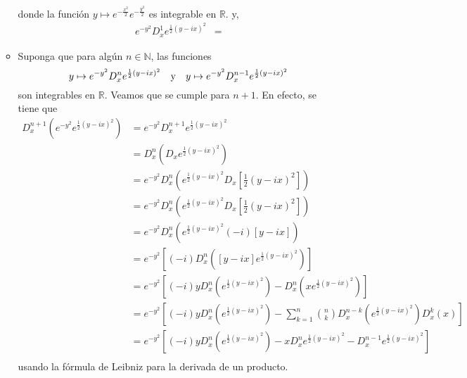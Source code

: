\documentclass[12pt]{report}
\newcounter{it}
\theoremstyle{largebreak}
\begin{document}
\begin{sol}
\begin{itemize}
\begin{itemize}
                donde la función $y\mapsto e^{-\frac{x^2}{2}}e^{-\frac{y^2}{2}}$ es integrable en $\mathbb{R}$.
                y,
                \begin{equation*}
                    \begin{split}
                        e^{ -y^2}D_x^1e^{\frac{1}{2}\left(y-ix \right)^2}&=
                    \end{split}
                \end{equation*}
                \item Suponga que para algún $n\in\mathbb{N}$, las funciones
                \begin{equation*}
                    y\mapsto e^{ -y^2}D_x^ne^{\frac{1}{2}\left(y-ix \right)^2}\quad\textup{y}\quad y\mapsto e^{ -y^2}D_x^{n-1}e^{\frac{1}{2}\left(y-ix \right)^2}
                \end{equation*}
                son integrables en $\mathbb{R}$. Veamos que se cumple para $n+1$. En efecto, se tiene que
                \begin{equation*}
                    \begin{split}
                        D_x^{n+1}\left(e^{-y^2}e^{\frac{1}{2}\left(y-ix \right)^2}\right)&=e^{-y^2}D_x^{n+1}e^{\frac{1}{2}\left(y-ix \right)^2}\\
                        &=D_x^n\left(D_x e^{\frac{1}{2}\left(y-ix \right)^2}\right)\\
                        &=e^{-y^2}D_x^n\left(e^{\frac{1}{2}\left(y-ix \right)^2}D_x\left[\frac{1}{2}\left(y-ix \right)^2\right] \right)\\
                        &=e^{-y^2}D_x^n\left(e^{\frac{1}{2}\left(y-ix \right)^2}D_x\left[\frac{1}{2}\left(y-ix \right)^2\right] \right)\\
                        &=e^{-y^2}D_x^n\left(e^{\frac{1}{2}\left(y-ix \right)^2}(-i)[y-ix]\right)\\
                        &=e^{-y^2}\left[(-i)D_x^n\left([y-ix]e^{\frac{1}{2}\left(y-ix \right)^2}\right)\right] \\
                        &=e^{-y^2}\left[(-i)yD_x^n\left(e^{\frac{1}{2}\left(y-ix \right)^2}\right)-D_x^n\left(xe^{\frac{1}{2}\left(y-ix \right)^2}\right)\right] \\
                        &=e^{-y^2}\left[(-i)yD_x^n\left(e^{\frac{1}{2}\left(y-ix \right)^2}\right)-\sum_{ k=1}^n {n\choose k} D_x^{ n-k}\left(e^{\frac{1}{2}\left(y-ix \right)^2}\right)D_x^k(x)\right] \\
                        &=e^{-y^2}\left[(-i)yD_x^n\left(e^{\frac{1}{2}\left(y-ix \right)^2}\right)-xD_x^ne^{\frac{1}{2}\left(y-ix \right)^2}-D_x^{n-1}e^{\frac{1}{2}\left(y-ix \right)^2}\right]\\
                    \end{split}
                \end{equation*}
                usando la fórmula de Leibniz para la derivada de un producto.
            \end{itemize}
        \end{itemize}
    \end{sol}
\end{document}
